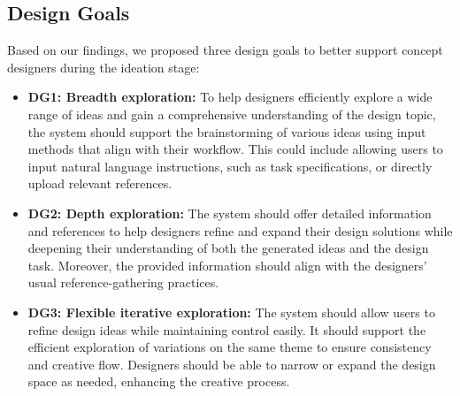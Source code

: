 \subsection{Design Goals}
Based on our findings, we proposed three design goals to better support concept designers during the ideation stage:
\begin{itemize}
    \item \textbf{DG1: Breadth exploration:} To help designers efficiently explore a wide range of ideas and gain a comprehensive understanding of the design topic, the system should support the brainstorming of various ideas using input methods that align with their workflow. This could include allowing users to input natural language instructions, such as task specifications, or directly upload relevant references.
\end{itemize}
\begin{itemize}
    \item \textbf{DG2: Depth exploration:} The system should offer detailed information and references to help designers refine and expand their design solutions while deepening their understanding of both the generated ideas and the design task. Moreover, the provided information should align with the designers' usual reference-gathering practices.
\end{itemize}
\begin{itemize}
    \item \textbf{DG3: Flexible iterative exploration:} The system should allow users to refine design ideas while maintaining control easily. It should support the efficient exploration of variations on the same theme to ensure consistency and creative flow. Designers should be able to narrow or expand the design space as needed, enhancing the creative process.
\end{itemize}

